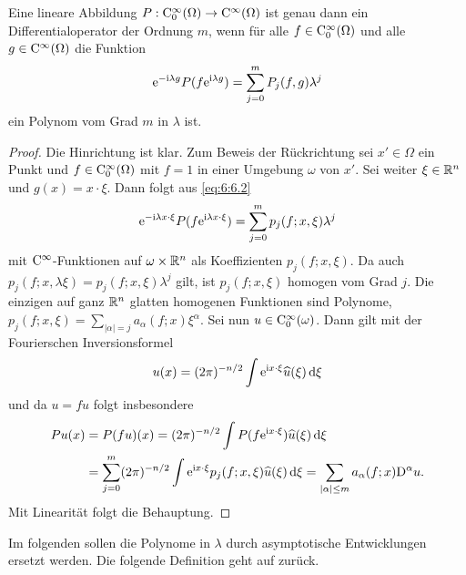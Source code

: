 \begin{lem}
Eine  lineare Abbildung   $P:\mathrm C_0^\infty(\Omega)\to\mathrm C^\infty(\Omega)$ ist genau dann ein Differentialoperator der Ordnung $m$, wenn für alle $f\in\mathrm C_0^\infty(\Omega)$ und alle $g\in\mathrm C^\infty(\Omega)$ die Funktion 
\begin{equation}\label{eq:6:6.2}
\mathrm e^{-\mathrm i\lambda g} P(f\mathrm e^{\mathrm i\lambda g}) = \sum_{j=0}^m P_j(f,g) \lambda^j
\end{equation}
ein Polynom vom Grad $m$ in $\lambda$ ist.
\end{lem}
\begin{proof}
Die Hinrichtung ist klar. Zum Beweis der Rückrichtung sei $x'\in\Omega$ ein Punkt und $f\in\mathrm C_0^\infty(\Omega)$ mit $f=1$  in einer Umgebung $\omega$ von $x'$. Sei weiter $\xi\in\mathbb R^n$ und $g(x) = x\cdot\xi$. Dann folgt aus \eqref{eq:6:6.2}
\begin{equation}
    \mathrm e^{-\mathrm i \lambda x\cdot\xi} P ( f\mathrm e^{\mathrm i \lambda x\cdot\xi}) = \sum_{j=0}^m p_j(f;x,\xi) \lambda^j
\end{equation}
mit $\mathrm C^\infty$-Funktionen auf $\omega\times\mathbb R^n$ als Koeffizienten $p_j(f;x,\xi)$. Da auch
$p_j(f;x,\lambda\xi)=p_j(f;x,\xi)\lambda^j$ gilt, ist $p_j(f;x,\xi)$ homogen vom Grad $j$. Die einzigen auf ganz $\mathbb R^n$ glatten homogenen Funktionen sind Polynome,
$p_j(f;x,\xi) = \sum_{|\alpha|=j} a_\alpha(f;x) \xi^\alpha$. Sei nun $u\in\mathrm C_0^\infty(\omega)$. Dann gilt mit der Fourierschen Inversionsformel
\begin{equation}
    u(x) = (2\pi)^{-n/2} \int \mathrm e^{\mathrm i x\cdot\xi} \widehat u(\xi)\,\mathrm d\xi
\end{equation}
und da $u=fu$ folgt insbesondere 
\begin{align}
    Pu(x) &= P(fu)(x) = (2\pi)^{-n/2} \int P(f \mathrm e^{\mathrm i x\cdot\xi}) \widehat u(\xi)\,\mathrm d\xi \notag \\&= \sum_{j=0}^m (2\pi)^{-n/2} \int \mathrm e^{\mathrm i x\cdot\xi} p_j(f;x,\xi) \widehat u(\xi)\,\mathrm d\xi
    = \sum_{|\alpha|\le m} a_\alpha(f;x)\mathrm D^\alpha u.
\end{align}
Mit Linearität folgt die Behauptung.
\end{proof}

Im folgenden sollen die Polynome in $\lambda$ durch asymptotische Entwicklungen ersetzt werden. Die folgende Definition geht auf \cite{Hormander:1965} zurück.

